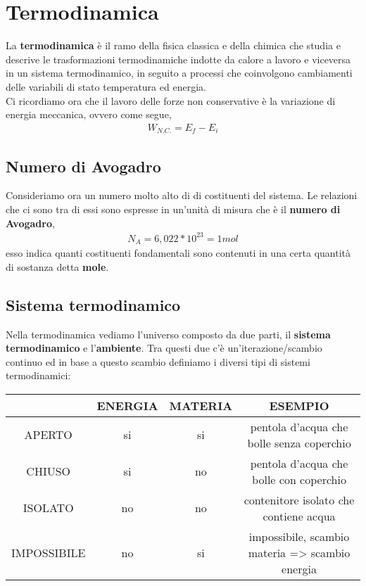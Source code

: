 \section{Termodinamica}
    La \textbf{termodinamica} è il ramo della fisica classica e della chimica che studia e descrive le trasformazioni termodinamiche indotte da calore a lavoro e viceversa in un sistema termodinamico, in seguito a processi che coinvolgono cambiamenti delle variabili di stato temperatura ed energia.\\
    Ci ricordiamo ora che il lavoro delle forze non conservative è la variazione di energia meccanica, ovvero come segue,
    \begin{align*}
        W_{N.C.} = E_f - E_i
    \end{align*}

    \subsection{Numero di Avogadro}
        Consideriamo ora un numero molto alto di di costituenti del sistema. Le relazioni che ci sono tra di essi sono espresse in un'unità di misura che è il \textbf{numero di Avogadro},
        \begin{align*}
            N_A = 6,022 * 10^{23} = 1mol
        \end{align*}
        esso indica quanti costituenti fondamentali sono contenuti in una certa quantità di sostanza detta \textbf{mole}.

    \subsection{Sistema termodinamico}
        Nella termodinamica vediamo l'universo composto da due parti, il \textbf{sistema termodinamico} e l'\textbf{ambiente}. Tra questi due c'è un'iterazione/scambio continuo ed in base a questo scambio definiamo i diversi tipi di sistemi termodinamici:
        \begin{center}
            \begin{tabular} { |c|c|c|c| }
                \hline
                & ENERGIA & MATERIA & ESEMPIO\\
                \hline
                APERTO & si & si & pentola d'acqua che bolle senza coperchio\\
                \hline
                CHIUSO & si & no & pentola d'acqua che bolle con coperchio\\
                \hline
                ISOLATO & no & no & contenitore isolato che contiene acqua\\
                \hline
                IMPOSSIBILE & no & si & impossibile, scambio materia => scambio energia\\
                \hline
            \end{tabular}
        \end{center}


